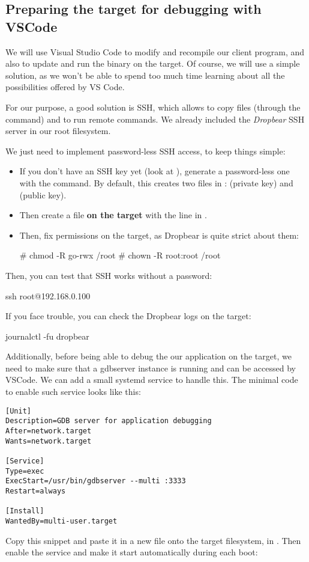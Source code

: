 \subsection{Preparing the target for debugging with VSCode}

We will use Visual Studio Code to modify and recompile our client
program, and also to update and run the binary on the target.
Of course, we will use a simple solution, as we won't be able to
spend too much time learning about all the possibilities offered
by VS Code.

For our purpose, a good solution is SSH, which allows to copy files
(through the  command) and to run remote commands. We already
included the {\em Dropbear} SSH server in our root filesystem.

We just need to implement password-less SSH access, to keep things
simple:

\begin{itemize}
  \item If you don't have an SSH key yet (look at ),
	generate a password-less one with the  command.
	By default, this creates two files in :
	 (private key) and  (public key).
  \item Then create a  file {\bf on the target}
        with the line in .
  \item Then, fix permissions on the target, as Dropbear is quite strict
        about them:
        \begin{bashinput}
# chmod -R go-rwx /root
# chown -R root:root /root
        \end{bashinput}
\end{itemize}

Then, you can test that SSH works without a password:

\begin{bashinput}
ssh root@192.168.0.100
\end{bashinput}

If you face trouble, you can check the Dropbear logs on the target:

\begin{bashinput}
journalctl -fu dropbear
\end{bashinput}

Additionally, before being able to debug the our application on the target, we
need to make sure that a gdbserver instance is running and can be accessed
by VSCode. We can add a small systemd service to handle this. The minimal
code to enable such service looks like this:
\begin{verbatim}
[Unit]
Description=GDB server for application debugging
After=network.target
Wants=network.target

[Service]
Type=exec
ExecStart=/usr/bin/gdbserver --multi :3333
Restart=always

[Install]
WantedBy=multi-user.target
\end{verbatim}
Copy this snippet and paste it in a new  file onto
the target filesystem, in . Then enable the
service and make it start automatically during each boot:

